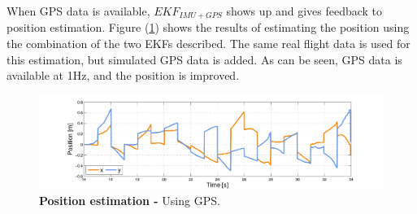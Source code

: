 \documentclass[conference]{IEEEtran}
\newcommand{\refp}[1]{(\ref{#1})}
\begin{document}
When GPS data is available, $EKF_{IMU+GPS}$ shows up and gives feedback to position estimation. Figure \refp{fig:kalman_con_gps} shows the results of estimating the position using the combination of the two EKFs described. The same real flight data is used for this estimation, but simulated GPS data is added. As can be seen, GPS data is available at 1Hz, and the position is improved.
 \begin{figure}
 \centering
 \vspace{-0.5cm}
	\includegraphics[width=.7\columnwidth]{./pics_paper/position_gps_fake.pdf}
	\caption{\textbf{Position estimation -} Using GPS.}
	\label{fig:kalman_con_gps}
	\vspace{-0.5cm}
\end{figure}

\end{document}
